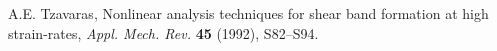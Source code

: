 \documentclass[a4paper,11pt]{article}
\theoremstyle{remark}
\begin{document}
\begin{thebibliography}{10}

{\sc A.E. Tzavaras},
Nonlinear analysis techniques for shear band formation at high strain-rates,
{\it Appl. Mech. Rev.}
{\bf  45} (1992), S82--S94.



%
%


%
%
%
%

%
%
%
%
%
%
%
%


\end{thebibliography}
\end{document}

